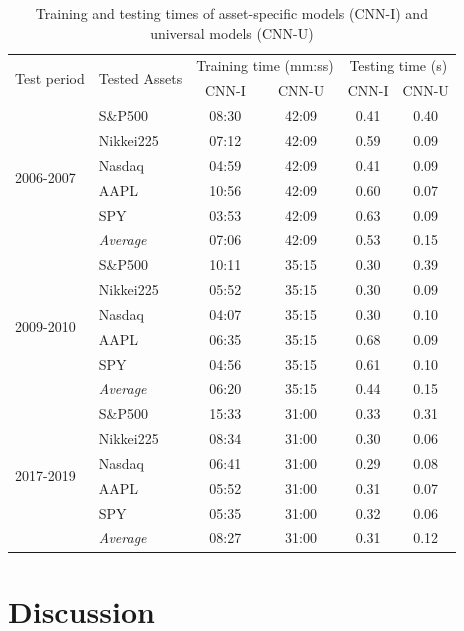 \documentclass[11pt, a4paper]{article}
\begin{document}
\begin{table}[H]
\centering
\begin{tabular}{l|l|cc|cc}
\multicolumn{1}{m{1cm}|}{\multirow{2}{1cm}{Test period}} & \multicolumn{1}{m{1.5cm}|}{\multirow{2}{1.5cm}{Tested Assets}} & \multicolumn{2}{m{3.5cm}}{Training time (mm:ss) } & \multicolumn{2}{m{3.5cm}}{Testing time (s)} \\ \cline{3-6}
&& CNN-I & CNN-U & CNN-I & CNN-U \\ 
\hline \hline
\multirow{6}{1cm}{2006-2007} & S\&P500   & 08:30 & 42:09 & 0.41 & 0.40 \\
          & Nikkei225 & 07:12 & 42:09 & 0.59 & 0.09 \\
          & Nasdaq    & 04:59 & 42:09 & 0.41 & 0.09 \\
          & AAPL      & 10:56 & 42:09 & 0.60 & 0.07 \\
          & SPY       & 03:53 & 42:09 & 0.63 & 0.09 \\ \cline{2-6}
          & \textit{Average}   & 07:06 & 42:09 & 0.53 & 0.15 \\ \hline
\multirow{6}{1cm}{2009-2010} & S\&P500   & 10:11 & 35:15 & 0.30 & 0.39 \\ 
          & Nikkei225 & 05:52 & 35:15 & 0.30 & 0.09 \\
          & Nasdaq    & 04:07 & 35:15 & 0.30 & 0.10 \\
          & AAPL      & 06:35 & 35:15 & 0.68 & 0.09 \\
          & SPY       & 04:56 & 35:15 & 0.61 & 0.10 \\ \cline{2-6}
          & \textit{Average}   & 06:20 & 35:15 & 0.44 & 0.15 \\\hline
\multirow{6}{1cm}{2017-2019} & S\&P500   & 15:33 & 31:00 & 0.33 & 0.31 \\
          & Nikkei225 & 08:34 & 31:00 & 0.30 & 0.06 \\
          & Nasdaq    & 06:41 & 31:00 & 0.29 & 0.08 \\
          & AAPL      & 05:52 & 31:00 & 0.31 & 0.07 \\
          & SPY       & 05:35 & 31:00 & 0.32 & 0.06 \\ \cline{2-6}
          & \textit{Average}   & 08:27 & 31:00 & 0.31 & 0.12
\end{tabular}
\caption{Training and testing times of asset-specific models (CNN-I) and universal models (CNN-U)}
\label{tbl:TimeRes}
\end{table}

\section{Discussion}
\label{sec:Discuss}
\end{document}
